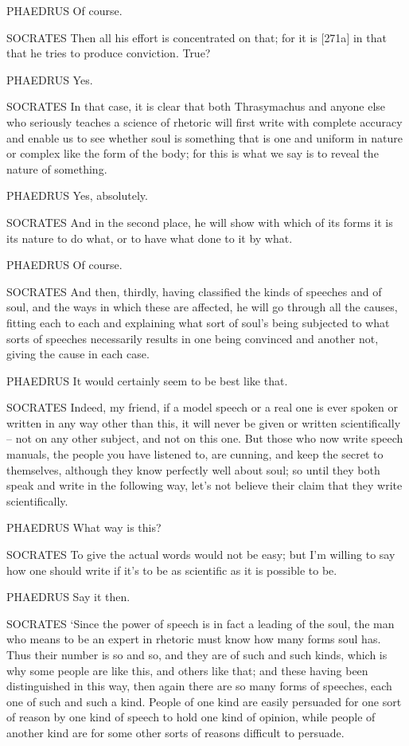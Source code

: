 PHAEDRUS Of course.

SOCRATES Then all his effort is concentrated on that; for it is
{[}271a{]} in that that he tries to produce conviction. True?

PHAEDRUS Yes.

SOCRATES In that case, it is clear that both Thrasymachus and anyone
else who seriously teaches a science of rhetoric will first 
write with complete accuracy and enable us to see whether soul is
something that is one and uniform in nature or complex like the form of
the body; for this is what we say is to reveal the nature of something.

PHAEDRUS Yes, absolutely.

SOCRATES And in the second place, he will show with which  of
its forms it is its nature to do what, or to have what done to it by
what.

PHAEDRUS Of course.

SOCRATES And then, thirdly, having classified the
kinds of 
speeches and of soul, and the ways in which these are affected, he will
go through all the causes, fitting each to each and explaining what sort
of soul's being subjected to what sorts of speeches necessarily results
in one being convinced and another not, giving the cause in each case.


PHAEDRUS It would certainly seem to be best like that.

SOCRATES Indeed, my friend, if a model
speech or a real one is
ever spoken or written in any way other than this, it will never be
given or written scientifically -- not on any other  subject,
and not on this one. But
those who now write speech manuals, the people you have listened to, are
cunning, and keep the secret to themselves, although they know perfectly
well about soul; so until they both speak and write in the following
way, let's not believe their claim that they write scientifically.

PHAEDRUS What way is this? 

SOCRATES To give the actual words would not be easy; but I'm willing to
say how one should write
if it's to be as scientific as it is possible to be.

PHAEDRUS Say it then.

 SOCRATES ‘Since the power of speech is in fact a leading of
the soul,  the man who means to be an expert in rhetoric must
know how many forms soul has. Thus their number is so and so, and they
are of such and such kinds, which is why some people are like this, and
others like that; and these having been distinguished in this way, then
again there are so many forms of  speeches, each one of such and
such a kind. People of one kind are easily persuaded for one sort of
reason by one kind of speech to hold one kind of opinion, while people
of another kind are for some other sorts of reasons difficult to
persuade.

